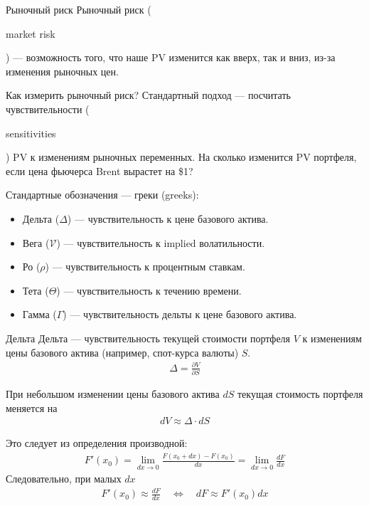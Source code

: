 \documentclass{beamer}
\newcommand{\en}[1]{\begin{otherlanguage}{english}#1\end{otherlanguage}}
\begin{document}
\begin{frame}{Рыночный риск}
\justify
\alert{Рыночный риск} (\en{market risk}) --- возможность того, что наше PV изменится как вверх, так и вниз, из-за изменения рыночных цен.

\justify
Как измерить рыночный риск? Стандартный подход --- посчитать чувствительности (\en{sensitivities}) PV к изменениям рыночных переменных. На сколько изменится PV портфеля, если цена фьючерса Brent вырастет на \$1?

\justify
Стандартные обозначения --- греки (greeks):
\begin{itemize}
\item Дельта ($\Delta$) --- чувствительность к цене базового актива.
\item Вега ($\mathcal{V}$) --- чувствительность к implied волатильности.
\item Ро ($\rho$) --- чувствительность к процентным ставкам.
\item Тета ($\Theta$) --- чувствительность к течению времени.
\item Гамма ($\Gamma$) --- чувствительность дельты к цене базового актива.
\end{itemize}
\end{frame}



\begin{frame}{Дельта}
\justify
Дельта --- чувствительность текущей стоимости портфеля $V$ к изменениям цены базового актива (например, спот-курса валюты) $S$. 
\begin{align*}
\Delta = \frac{\partial V}{\partial S}
\end{align*}

\justify
При небольшом изменении цены базового актива $dS$ текущая стоимость портфеля меняется на
\begin{align*}
dV \approx \Delta\cdot dS
\end{align*}

\justify
Это следует из определения производной:
\begin{align*}
F'(x_0) = \lim_{dx \to 0} \frac{F(x_0+dx) - F(x_0)}{dx} = \lim_{dx \to 0} \frac{dF}{dx}
\end{align*}
Следовательно, при малых $dx$
\begin{align*}
F'(x_0) \approx \frac{dF}{dx} \quad \Leftrightarrow \quad dF \approx F'(x_0)dx
\end{align*}
\end{frame}
\end{document}
